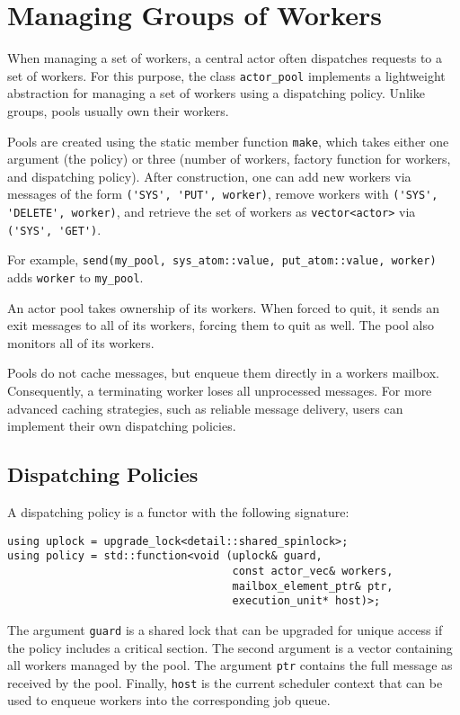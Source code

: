 \section{Managing Groups of Workers \experimental}
\label{worker-groups}

When managing a set of workers, a central actor often dispatches requests to a set of workers.
For this purpose, the class \lstinline^actor_pool^ implements a lightweight abstraction for managing a set of workers using a dispatching policy. Unlike groups, pools usually own their workers.

Pools are created using the static member function \lstinline^make^, which takes either one argument (the policy) or three (number of workers, factory function for workers, and dispatching policy).
After construction, one can add new workers via messages of the form \lstinline^('SYS', 'PUT', worker)^, remove workers with \lstinline^('SYS', 'DELETE', worker)^, and retrieve the set of workers as \lstinline^vector<actor>^ via \lstinline^('SYS', 'GET')^. 

For example, \lstinline^send(my_pool, sys_atom::value, put_atom::value, worker)^ adds \lstinline^worker^ to \lstinline^my_pool^.

An actor pool takes ownership of its workers.
When forced to quit, it sends an exit messages to all of its workers, forcing them to quit as well.
The pool also monitors all of its workers.

Pools do not cache messages, but enqueue them directly in a workers mailbox. Consequently, a terminating worker loses all unprocessed messages. For more advanced caching strategies, such as reliable message delivery, users can implement their own dispatching policies. 

\subsection{Dispatching Policies}

A dispatching policy is a functor with the following signature:

\begin{lstlisting}
using uplock = upgrade_lock<detail::shared_spinlock>;
using policy = std::function<void (uplock& guard,
                                   const actor_vec& workers,
                                   mailbox_element_ptr& ptr,
                                   execution_unit* host)>;
\end{lstlisting}

The argument \lstinline^guard^ is a shared lock that can be upgraded for unique access if the policy includes a critical section. The second argument is a vector containing all workers managed by the pool. The argument \lstinline^ptr^ contains the full message as received by the pool. Finally, \lstinline^host^ is the current scheduler context that can be used to enqueue workers into the corresponding job queue.

